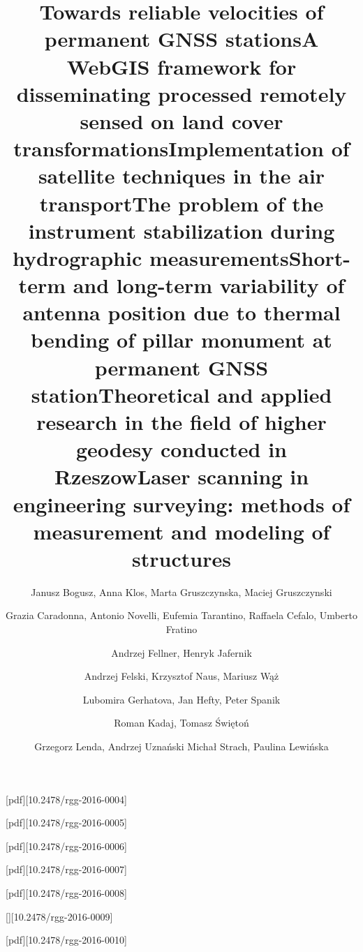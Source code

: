 \documentclass
[
  volume = 100,
  number = 1,
  year   = 2016,
]
{rgg}
\begin{document}
    

    \makecolophon

    {
      \thispagestyle{empty}
      \listofpapers
      \thispagestyle{empty}
    }
    \cleardoublepage

    \title{Towards reliable velocities of permanent GNSS stations}
    \author{Janusz Bogusz,  Anna Klos,  Marta Gruszczynska,  Maciej Gruszczynski}

    \title
    [A WebGIS framework for disseminating processed remotely sensed\ldots]
    {A WebGIS framework for disseminating processed remotely sensed on land cover transformations}
    \author[Caradonna, G. et al.]{Grazia Caradonna, Antonio Novelli, Eufemia Tarantino, Raffaela  Cefalo, Umberto Fratino}
    [pdf][10.2478/rgg-2016-0004]

    \title
    {Implementation of satellite techniques in the air transport}
    \author[Fellner, A. Jafernik, H.]
    {Andrzej Fellner, Henryk Jafernik}
    [pdf][10.2478/rgg-2016-0005]

    \title{The problem of the instrument stabilization during hydrographic measurements}
    \author[Felski, A. et al.]{Andrzej Felski, Krzysztof Naus, Mariusz Wąż}
    [pdf][10.2478/rgg-2016-0006]

    \title
    [Short-term and long-term variability of antenna position\ldots]
    {Short-term and long-term variability of antenna position due to thermal bending of pillar monument at permanent GNSS station} 
    \author[Gerhatova, L. et al.]{Lubomira Gerhatova, Jan Hefty, Peter Spanik}
    [pdf][10.2478/rgg-2016-0007]

    \title
    [Theoretical and applied research in the field of higher geodesy\ldots]
    {Theoretical and applied research in the field of higher geodesy conducted in Rzeszow}
    \author[Kadaj, R., Świętoń, T.]{Roman Kadaj, Tomasz Świętoń}
    [pdf][10.2478/rgg-2016-0008]

    {
      \bibtextobiblatex
      [][10.2478/rgg-2016-0009]
    }

    \title[Laser scanning in engineering surveying\ldots]{Laser scanning in engineering surveying: methods of measurement and modeling of structures}
    \author[Lenda, G. et al.]{Grzegorz Lenda, Andrzej Uznański Michał Strach, Paulina Lewińska} 
    [pdf][10.2478/rgg-2016-0010]
\end{document}
